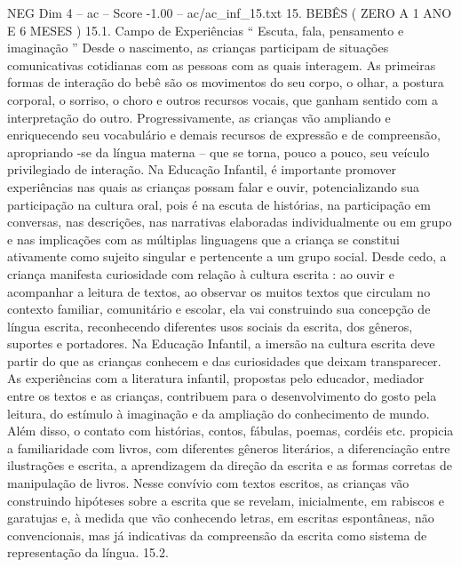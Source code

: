 \begin{textsample}{NEG Dim 4 – ac – Score -1.00 – ac/ac\_inf\_15.txt}  \label{ex:f4_neg_048}
15.
BEBÊS ( ZERO A 1 ANO E 6 MESES ) 15.1.
Campo de Experiências “ Escuta, fala, pensamento e imaginação ” Desde o nascimento, as crianças participam de situações comunicativas cotidianas com as pessoas com as quais interagem.
As primeiras formas de interação do bebê são os movimentos do seu corpo, o olhar, a postura corporal, o sorriso, o choro e outros recursos vocais, que ganham sentido com a interpretação do outro.
Progressivamente, as crianças vão ampliando e enriquecendo seu vocabulário e demais recursos de expressão e de compreensão, apropriando -se da língua materna – que se torna, pouco a pouco, seu veículo privilegiado de interação.
Na Educação Infantil, é importante promover experiências nas quais as crianças possam falar e ouvir, potencializando sua participação na cultura oral, pois é na escuta de histórias, na participação em conversas, nas descrições, nas narrativas elaboradas individualmente ou em grupo e nas implicações com as múltiplas linguagens que a criança se constitui ativamente como sujeito singular e pertencente a um grupo social.
Desde cedo, a criança manifesta curiosidade com relação à cultura escrita : ao ouvir e acompanhar a leitura de textos, ao observar os muitos textos que circulam no contexto familiar, comunitário e escolar, ela vai construindo sua concepção de língua escrita, reconhecendo diferentes usos sociais da escrita, dos gêneros, suportes e portadores.
Na Educação Infantil, a imersão na cultura escrita deve partir do que as crianças conhecem e das curiosidades que deixam transparecer.
As experiências com a literatura infantil, propostas pelo educador, mediador entre os textos e as crianças, contribuem para o desenvolvimento do gosto pela leitura, do estímulo à imaginação e da ampliação do conhecimento de mundo.
Além disso, o contato com histórias, contos, fábulas, poemas, cordéis etc. propicia a familiaridade com livros, com diferentes gêneros literários, a diferenciação entre ilustrações e escrita, a aprendizagem da direção da escrita e as formas corretas de manipulação de livros.
Nesse convívio com textos escritos, as crianças vão construindo hipóteses sobre a escrita que se revelam, inicialmente, em rabiscos e garatujas e, à medida que vão conhecendo letras, em escritas espontâneas, não convencionais, mas já indicativas da compreensão da escrita como sistema de representação da língua. 15.2.

\end{textsample}
